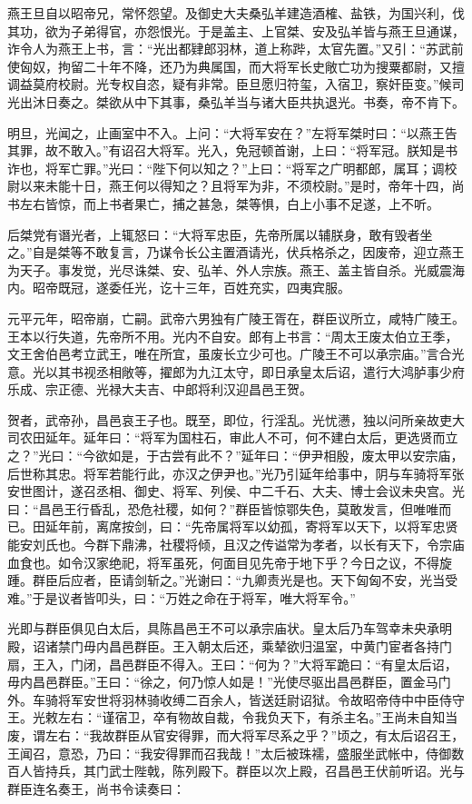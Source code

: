 \documentclass[]{article}
\begin{document}
燕王旦自以昭帝兄，常怀怨望。及御史大夫桑弘羊建造酒榷、盐铁，为国兴利，伐其功，欲为子弟得官，亦怨恨光。于是盖主、上官桀、安及弘羊皆与燕王旦通谋，诈令人为燕王上书，言：``光出都肄郎羽林，道上称跸，太官先置。''又引：``苏武前使匈奴，拘留二十年不降，还乃为典属国，而大将军长史敞亡功为搜粟都尉，又擅调益莫府校尉。光专权自恣，疑有非常。臣旦愿归符玺，入宿卫，察奸臣变。''候司光出沐日奏之。桀欲从中下其事，桑弘羊当与诸大臣共执退光。书奏，帝不肯下。

明旦，光闻之，止画室中不入。上问：``大将军安在？''左将军桀时曰：``以燕王告其罪，故不敢入。''有诏召大将军。光入，免冠顿首谢，上曰：``将军冠。朕知是书诈也，将军亡罪。''光曰：``陛下何以知之？''上曰：``将军之广明都郎，属耳；调校尉以来未能十日，燕王何以得知之？且将军为非，不须校尉。''是时，帝年十四，尚书左右皆惊，而上书者果亡，捕之甚急，桀等惧，白上小事不足遂，上不听。

后桀党有谮光者，上辄怒曰：``大将军忠臣，先帝所属以辅朕身，敢有毁者坐之。''自是桀等不敢复言，乃谋令长公主置酒请光，伏兵格杀之，因废帝，迎立燕王为天子。事发觉，光尽诛桀、安、弘羊、外人宗族。燕王、盖主皆自杀。光威震海内。昭帝既冠，遂委任光，讫十三年，百姓充实，四夷宾服。

元平元年，昭帝崩，亡嗣。武帝六男独有广陵王胥在，群臣议所立，咸特广陵王。王本以行失道，先帝所不用。光内不自安。郎有上书言：``周太王废太伯立王季，文王舍伯邑考立武王，唯在所宜，虽废长立少可也。广陵王不可以承宗庙。''言合光意。光以其书视丞相敞等，擢郎为九江太守，即日承皇太后诏，遣行大鸿胪事少府乐成、宗正德、光禄大夫吉、中郎将利汉迎昌邑王贺。

贺者，武帝孙，昌邑哀王子也。既至，即位，行淫乱。光忧懑，独以问所亲故吏大司农田延年。延年曰：``将军为国柱石，审此人不可，何不建白太后，更选贤而立之？''光曰：``今欲如是，于古尝有此不？''延年曰：``伊尹相殷，废太甲以安宗庙，后世称其忠。将军若能行此，亦汉之伊尹也。''光乃引延年给事中，阴与车骑将军张安世图计，遂召丞相、御史、将军、列侯、中二千石、大夫、博士会议未央宫。光曰：``昌邑王行昏乱，恐危社稷，如何？''群臣皆惊鄂失色，莫敢发言，但唯唯而已。田延年前，离席按剑，曰：``先帝属将军以幼孤，寄将军以天下，以将军忠贤能安刘氏也。今群下鼎沸，社稷将倾，且汉之传谥常为孝者，以长有天下，令宗庙血食也。如令汉家绝祀，将军虽死，何面目见先帝于地下乎？今日之议，不得旋踵。群臣后应者，臣请剑斩之。''光谢曰：``九卿责光是也。天下匈匈不安，光当受难。''于是议者皆叩头，曰：``万姓之命在于将军，唯大将军令。''

光即与群臣俱见白太后，具陈昌邑王不可以承宗庙状。皇太后乃车驾幸未央承明殿，诏诸禁门毋内昌邑群臣。王入朝太后还，乘辇欲归温室，中黄门宦者各持门扇，王入，门闭，昌邑群臣不得入。王曰：``何为？''大将军跪曰：``有皇太后诏，毋内昌邑群臣。''王曰：``徐之，何乃惊人如是！''光使尽驱出昌邑群臣，置金马门外。车骑将军安世将羽林骑收缚二百余人，皆送廷尉诏狱。令故昭帝侍中中臣侍守王。光敕左右：``谨宿卫，卒有物故自裁，令我负天下，有杀主名。''王尚未自知当废，谓左右：``我故群臣从官安得罪，而大将军尽系之乎？''顷之，有太后诏召王，王闻召，意恐，乃曰：``我安得罪而召我哉！''太后被珠襦，盛服坐武帐中，侍御数百人皆持兵，其门武士陛戟，陈列殿下。群臣以次上殿，召昌邑王伏前听诏。光与群臣连名奏王，尚书令读奏曰：
\end{document}
